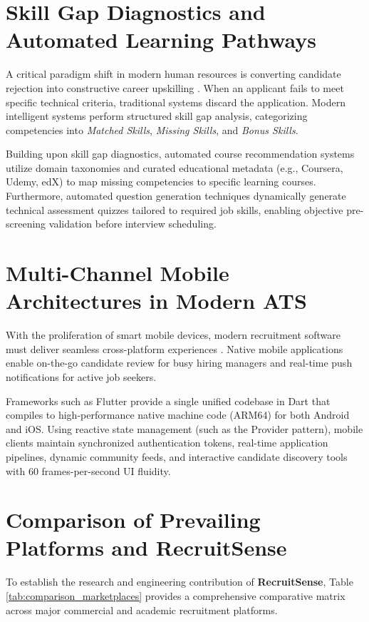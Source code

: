 \section{Skill Gap Diagnostics and Automated Learning Pathways}
A critical paradigm shift in modern human resources is converting candidate rejection into constructive career upskilling \cite{karimi2020course}. When an applicant fails to meet specific technical criteria, traditional systems discard the application. Modern intelligent systems perform structured skill gap analysis, categorizing competencies into \textit{Matched Skills}, \textit{Missing Skills}, and \textit{Bonus Skills}.

Building upon skill gap diagnostics, automated course recommendation systems utilize domain taxonomies and curated educational metadata (e.g., Coursera, Udemy, edX) to map missing competencies to specific learning courses. Furthermore, automated question generation techniques \cite{kurdi2020quiz} dynamically generate technical assessment quizzes tailored to required job skills, enabling objective pre-screening validation before interview scheduling.

\section{Multi-Channel Mobile Architectures in Modern ATS}
With the proliferation of smart mobile devices, modern recruitment software must deliver seamless cross-platform experiences \cite{flutter2022google}. Native mobile applications enable on-the-go candidate review for busy hiring managers and real-time push notifications for active job seekers.

Frameworks such as Flutter provide a single unified codebase in Dart that compiles to high-performance native machine code (ARM64) for both Android and iOS. Using reactive state management (such as the Provider pattern), mobile clients maintain synchronized authentication tokens, real-time application pipelines, dynamic community feeds, and interactive candidate discovery tools with 60 frames-per-second UI fluidity.

\section{Comparison of Prevailing Platforms and RecruitSense}
To establish the research and engineering contribution of \textbf{RecruitSense}, Table \ref{tab:comparison_marketplaces} provides a comprehensive comparative matrix across major commercial and academic recruitment platforms.

